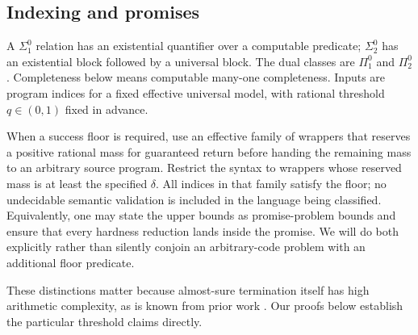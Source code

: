 \documentclass[11pt,letterpaper]{article}
\numberwithin{equation}{section}
\theoremstyle{definition}
\theoremstyle{remark}
\newcommand{\sigone}{\Sigma^0_1}
\newcommand{\pione}{\Pi^0_1}
\newcommand{\sigtwo}{\Sigma^0_2}
\newcommand{\pitwo}{\Pi^0_2}
\begin{document}
\subsection{Indexing and promises}
A $\sigone$ relation has an existential quantifier over a computable
predicate; $\sigtwo$ has an existential block followed by a universal block.
The dual classes are $\pione$ and $\pitwo$. Completeness below means
computable many-one completeness. Inputs are program indices for a fixed
effective universal model, with rational threshold $q\in(0,1)$ fixed in
advance.

When a success floor is required, use an effective family of wrappers that
reserves a positive rational mass for guaranteed return before handing the
remaining mass to an arbitrary source program. Restrict the syntax to
wrappers whose reserved mass is at least the specified $\delta$.
All indices in that family satisfy the floor; no undecidable semantic
validation is included in the language being classified. Equivalently,
one may state the upper bounds as promise-problem bounds and ensure that
every hardness reduction lands inside the promise. We will do both
explicitly rather than silently conjoin an arbitrary-code problem with an
additional floor predicate.

These distinctions matter because almost-sure termination itself has high
arithmetic complexity, as is known from prior work
\cite{kaminski-katoen}. Our proofs below establish the particular threshold
claims directly.
\end{document}

